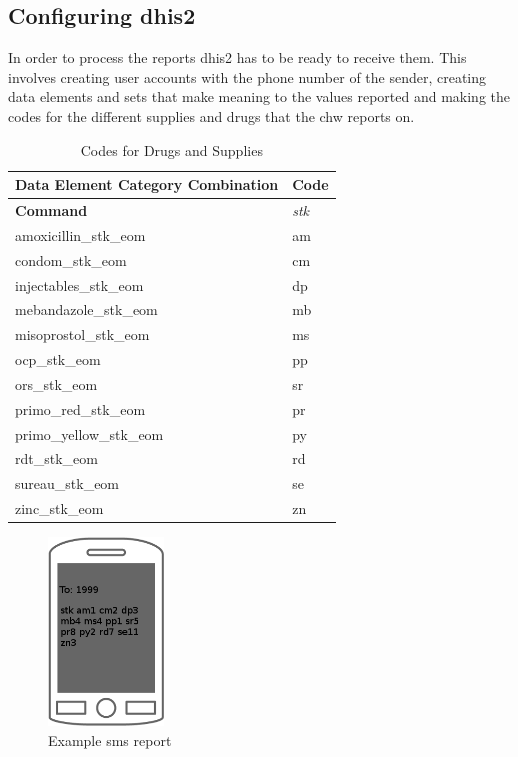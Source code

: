 \subsection{Configuring \gls{dhis2}}
In order to process the reports \gls{dhis2} has to be ready to receive them.
This involves creating user accounts with the phone number of the sender, creating data elements and sets that make meaning to the values reported and making the codes for the different supplies and drugs that the \gls{chw} reports on. 

\begin{table}
\centering
\begin{tabular}{l l}

\textbf{Data Element Category Combination} &	\textbf{Code} \\
\hline
\textbf{Command} & \textit{stk} \\
amoxicillin\_stk\_eom &	am\\
condom\_stk\_eom & cm\\
injectables\_stk\_eom &	dp\\
mebandazole\_stk\_eom &	mb\\
misoprostol\_stk\_eom &	ms\\
ocp\_stk\_eom &	pp\\
ors\_stk\_eom &	sr\\
primo\_red\_stk\_eom &	pr\\
primo\_yellow\_stk\_eom & py\\
rdt\_stk\_eom &	rd\\
sureau\_stk\_eom & se\\
zinc\_stk\_eom & zn \\
\hline
\end{tabular}
\caption{Codes for Drugs and Supplies}
\label{tab:codesDS}
\end{table}

\begin{figure}
\centering
\includegraphics[height=5cm]{case/img/smsExample}
\caption{Example \gls{sms} report}
\label{fig:exsms}
\end{figure}

